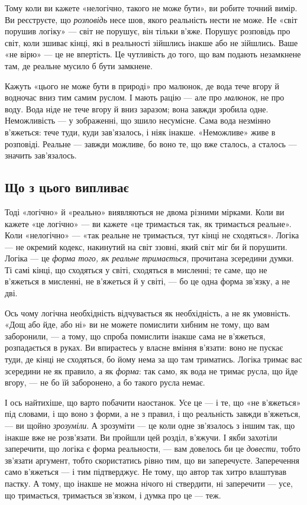 \documentclass[12pt, a4paper, openany]{book}
\begin{document}
Тому коли ви кажете «нелогічно, такого не може бути», ви робите точний вимір. Ви реєструєте, що \emph{розповідь} несе шов, якого реальність нести не може. Не «світ порушив логіку» --- світ не порушує, він тільки в'яже. Порушує розповідь про світ, коли зшиває кінці, які в реальності зійшлись інакше або не зійшлись. Ваше «не вірю» --- це не впертість. Це чутливість до того, що вам подають незамкнене там, де реальне мусило б бути замкнене.

\begin{analogybox}
Кажуть «цього не може бути в природі» про малюнок, де вода тече вгору й водночас вниз тим самим руслом. І мають рацію --- але про \emph{малюнок}, не про воду. Вода ніде не тече вгору й вниз заразом; вона завжди зробила одне. Неможливість --- у зображенні, що зшило несумісне. Сама вода незмінно в'яжеться: тече туди, куди зав'язалось, і ніяк інакше. «Неможливе» живе в розповіді. Реальне --- завжди можливе, бо воно те, що вже сталось, а сталось --- значить зав'язалось.
\end{analogybox}

\subsection{Що з цього випливає}

Тоді «логічно» й «реально» виявляються не двома різними мірками. Коли ви кажете «це логічно» --- ви кажете «це тримається так, як тримається реальне». Коли «нелогічно» --- «так реальне не тримається, тут кінці не сходяться». Логіка --- не окремий кодекс, накинутий на світ ззовні, який світ міг би й порушити. Логіка --- це \emph{форма того, як реальне тримається}, прочитана зсередини думки. Ті самі кінці, що сходяться у світі, сходяться в мисленні; те саме, що не в'яжеться в мисленні, не в'яжеться й у світі, --- бо це одна форма зв'язку, а не дві.

Ось чому логічна необхідність відчувається як необхідність, а не як умовність. «Дощ або йде, або ні» ви не можете помислити хибним не тому, що вам заборонили, --- а тому, що спроба помислити інакше сама не в'яжеться, розпадається в руках. Ви впираєтесь у власне вміння в'язати: воно не пускає туди, де кінці не сходяться, бо йому нема за що там триматись. Логіка тримає вас зсередини не як правило, а як \emph{форма}: так само, як вода не тримає русла, що йде вгору, --- не бо їй заборонено, а бо такого русла немає.

І ось найтихіше, що варто побачити наостанок. Усе це --- і те, що «не в'яжеться» під словами, і що воно з форми, а не з правил, і що реальність завжди в'яжеться, --- ви щойно \emph{зрозуміли}. А зрозуміти --- це коли одне зв'язалось з іншим так, що інакше вже не розв'язати. Ви пройшли цей розділ, в'яжучи. І якби захотіли заперечити, що логіка є форма реальности, --- вам довелось би це \emph{довести}, тобто зв'язати аргумент, тобто скористатись рівно тим, що ви заперечуєте. Заперечення само в'яжеться --- і тим підтверджує. Не тому, що автор так хитро влаштував пастку. А тому, що інакше не можна нічого ні ствердити, ні заперечити --- усе, що тримається, тримається зв'язком, і думка про це --- теж.
\end{document}
